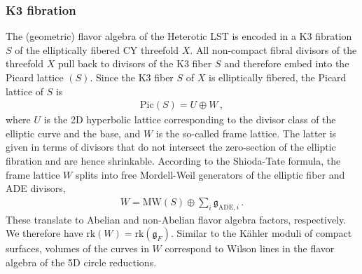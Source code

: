 \documentclass[11pt]{article}
\numberwithin{equation}{section}
\newcommand{\fg}{\mathfrak{g}}
\newcommand{\rk}{\text{rk}}
\newcommand{\Pic}{\text{Pic}}
\begin{document}
\subsubsection{K3 fibration}
The (geometric) flavor algebra of the Heterotic LST is encoded in a K3 fibration $S$ of the elliptically fibered CY threefold $X$. All non-compact fibral divisors of the threefold $X$ pull back to divisors of the K3 fiber $S$ and therefore embed into the Picard lattice \Pic$(S)$. Since the K3 fiber $S$ of $X$ is elliptically fibered, the Picard lattice of $S$ is 
\begin{align}
    \Pic(S)=U \oplus W   \, ,
\end{align}
where $U$ is the 2D hyperbolic lattice corresponding to the divisor class of the elliptic curve and the base, and $W$ is the so-called frame lattice. The latter is given in terms of divisors that do not intersect the zero-section of the elliptic fibration and are hence shrinkable. According to the Shioda-Tate formula, the frame lattice $W$ splits into free Mordell-Weil generators of the elliptic fiber and ADE divisors,
\begin{align}
\label{eq:FlavorK3}
    W = \text{MW}(S) \oplus \sum_{i} \fg_{\text{ADE},i}\,.
\end{align}
These translate to Abelian and non-Abelian flavor algebra factors, respectively. We therefore have $\rk(W)=\rk(\fg_F)$. Similar to the K\"ahler moduli of compact surfaces, volumes of the curves in $W$ correspond to Wilson lines in the flavor algebra of the 5D circle reductions.
\end{document}
